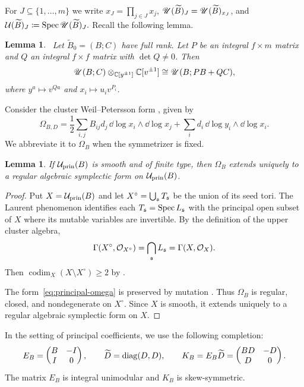 \documentclass[12pt, letter]{amsart}
\newtheorem{lemma}[theorem]{Lemma}
\theoremstyle{definition}
\newcommand{\D}{\mathcal D}
\newcommand{\U}{\mathscr U}
\newcommand{\pr}{\mathrm{prin}}
\numberwithin{equation}{section}
\begin{document}
For \(J \subseteq \{1,\ldots,m\}\) we write \(x_J = \prod_{j\in J} x_j\), \(\mathscr{U}(\widetilde B)_J = \mathscr{U}(\widetilde B)_{x_J}\), and \( \mathcal{U} (\widetilde B)_J \coloneqq \operatorname{Spec} \mathscr{U}(\widetilde B)_J.\)
Recall the following lemma.
\begin{lemma} \cite[Lemma 3.2]{HS} \ \label{lem:coefficients}
Let $\widetilde B_0=(B;C)$ have full rank. Let $P$ be an integral
$f\times m$ matrix and $Q$ an integral $f\times f$ matrix with
$\det Q\ne0$. Then
\begin{equation}\label{eq:coefficient-change}
 \U(B;C)\otimes_{\C[y^{\pm1}]}\C[v^{\pm1}]
       \cong\U(B;PB+QC),
\end{equation}
where $y^a\mapsto v^{Qa}$ and $x_i\mapsto u_i v^{P_i}$.
\end{lemma}


Consider the cluster Weil--Petersson form \cite{GSV05, FG09},
given by
\begin{equation}\label{eq:principal-omega}
 \Omega_{B,D}=\frac12\sum_{i,j}B_{ij}d_j\,
      \dd\log x_i\wedge\dd\log x_j
       +\sum_i d_i\,\dd\log y_i\wedge\dd\log x_i.
\end{equation}
We abbreviate it to $\Omega_B$ when the symmetrizer is fixed.


\begin{lemma} \label{lem: form}
If $\cU_{\pr}(B)$ is smooth and of finite type, then $\Omega_B$
extends uniquely to a regular algebraic symplectic form on
$\cU_{\pr}(B)$.
\end{lemma}
\begin{proof}
Put $X=\cU_{\pr}(B)$ and let
$X^\circ=\bigcup_{\mathfrak{s}}T_{\mathfrak{s}}$ be the union of its seed tori.
The Laurent phenomenon identifies each $T_{\mathfrak{s}}=\operatorname{Spec} L_{\mathfrak{s}}$
with the principal open subset of $X$ where its mutable variables
are invertible. By the definition of the upper cluster algebra,
\[
 \Gamma(X^\circ,\mathcal{O}_{X^\circ})
 =\bigcap_{\mathfrak{s}}L_{\mathfrak{s}}
 =\Gamma(X,\mathcal{O}_X).
\]
Then $\operatorname{codim}_X(X\setminus X^\circ)\ge2$
by \cite[Lemma~4.4.1]{Matherne-Muller}.

The form~\eqref{eq:principal-omega} is preserved by mutation
\cite[Corollary~6.5]{FG09}.
Thus $\Omega_B$ is regular, closed, and nondegenerate on $X^\circ$.
Since $X$ is smooth, it extends uniquely to a regular algebraic
symplectic form on $X$.
\end{proof}



In the setting of principal coefficients, we use the following completion:
\begin{equation}\label{eq:completion}
 E_B=\begin{pmatrix}B&-I\\ I&0\end{pmatrix},\qquad
 \widetilde D=\operatorname{diag}(D,D),\qquad
 K_B=E_B\widetilde D=\begin{pmatrix}BD&-D\\D&0\end{pmatrix}.
\end{equation}
The matrix $E_B$ is integral unimodular and $K_B$ is skew-symmetric.
\end{document}
